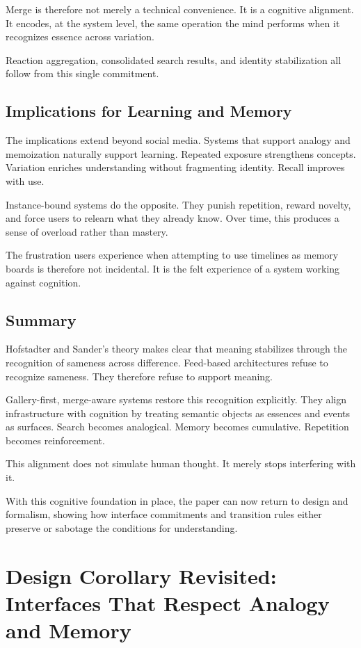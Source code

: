 \documentclass[11pt,oneside]{article}
\begin{document}
Merge is therefore not merely a technical convenience. It is a cognitive alignment. It encodes, at the system level, the same operation the mind performs when it recognizes essence across variation.

Reaction aggregation, consolidated search results, and identity stabilization all follow from this single commitment.

\subsection{Implications for Learning and Memory}

The implications extend beyond social media. Systems that support analogy and memoization naturally support learning. Repeated exposure strengthens concepts. Variation enriches understanding without fragmenting identity. Recall improves with use.

Instance-bound systems do the opposite. They punish repetition, reward novelty, and force users to relearn what they already know. Over time, this produces a sense of overload rather than mastery.

The frustration users experience when attempting to use timelines as memory boards is therefore not incidental. It is the felt experience of a system working against cognition.

\subsection{Summary}

Hofstadter and Sander’s theory makes clear that meaning stabilizes through the recognition of sameness across difference. Feed-based architectures refuse to recognize sameness. They therefore refuse to support meaning.

Gallery-first, merge-aware systems restore this recognition explicitly. They align infrastructure with cognition by treating semantic objects as essences and events as surfaces. Search becomes analogical. Memory becomes cumulative. Repetition becomes reinforcement.

This alignment does not simulate human thought. It merely stops interfering with it.

With this cognitive foundation in place, the paper can now return to design and formalism, showing how interface commitments and transition rules either preserve or sabotage the conditions for understanding.

\section{Design Corollary Revisited: Interfaces That Respect Analogy and Memory}
\end{document}
